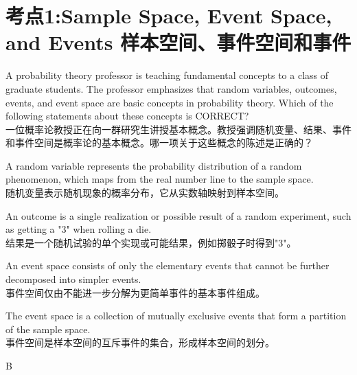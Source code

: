 \documentclass{article}
\newcounter{question} %
\begin{document}
 \tableofcontents %
\newpage


\section{考点1:Sample Space, Event Space, and Events 样本空间、事件空间和事件}

\begin{question}
    A probability theory professor is teaching fundamental concepts to a class of graduate students. The professor emphasizes that random variables, outcomes, events, and event space are basic concepts in probability theory. Which of the following statements about these concepts is CORRECT?\\
    一位概率论教授正在向一群研究生讲授基本概念。教授强调随机变量、结果、事件和事件空间是概率论的基本概念。哪一项关于这些概念的陈述是正确的？
    \end{question}
    
    \begin{choices}
        \item A random variable represents the probability distribution of a random phenomenon, which maps from the real number line to the sample space.\\
        随机变量表示随机现象的概率分布，它从实数轴映射到样本空间。
        \item An outcome is a single realization or possible result of a random experiment, such as getting a "3" when rolling a die.\\
        结果是一个随机试验的单个实现或可能结果，例如掷骰子时得到"3"。
        \item An event space consists of only the elementary events that cannot be further decomposed into simpler events.\\
        事件空间仅由不能进一步分解为更简单事件的基本事件组成。
        \item The event space is a collection of mutually exclusive events that form a partition of the sample space.\\
        事件空间是样本空间的互斥事件的集合，形成样本空间的划分。
    \end{choices}
    
    \begin{correctanswer}
    B
    \end{correctanswer}
    
\end{document}

